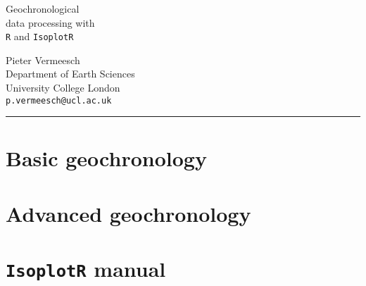 \documentclass[11pt,openany]{book}
\begin{document}
\begin{titlepage}
  
  \parbox[t]{0.93\textwidth}{
    \parbox[t]{0.91\textwidth}{
      \raggedleft
      \fontsize{50pt}{80pt}
      \vspace{0.7cm}
      \Huge
      Geochronological\\
      data processing with\\
      \texttt{R} and \texttt{IsoplotR} \\
    }
  }

\vfill
  
  \parbox[t]{0.93\textwidth}{
    \raggedleft
    \large
        {\Large Pieter Vermeesch}\\[4pt]
        Department of Earth Sciences\\
        University College London\\[4pt]
        \texttt{p.vermeesch@ucl.ac.uk}\\
	
        \hfill\rule{0.2\linewidth}{1pt}
}
	
\end{titlepage}

\makeatletter
\newlength\indentwidth
\setlength\indentwidth{\textwidth-27pt}
\makeatother

\tableofcontents

\part{Basic geochronology}

































\part{Advanced geochronology}









\part{\texttt{IsoplotR} manual}


\end{document}
